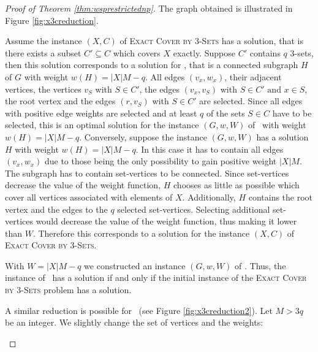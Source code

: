 \begin{proof}[Proof of Theorem \ref{thm:wsprestrictednp}]
	The graph obtained is illustrated in Figure \ref{fig:x3creduction}.\medskip
	
	Assume the instance $(X,C)$ of \textsc{Exact Cover by $3$-Sets} has a solution, that is there exists a subset $C' \subseteq C$ which covers $X$ exactly. Suppose $C'$ contains $q$ $3$-sets, then this solution corresponds to a solution for \maxWSP, that is a connected subgraph $H$ of $G$ with weight $w(H) = |X|M - q$. All edges $(v_x, w_x)$, their adjacent vertices, the vertices $v_S$ with $S \in C'$, the edges $(v_x, v_S)$ with $S \in C' \text{ and } x \in S$, the root vertex and the edges $(r, v_S)$ with $S \in C'$ are selected. Since all edges with positive edge weights are selected and at least $q$ of the sets $S \in C$ have to be selected, this is an optimal solution for the instance $(G,w,W)$ of \maxWSP\ with weight $w(H) = |X|M - q$. Conversely, suppose the instance $(G,w,W)$ has a solution $H$ with weight $w(H) = |X|M - q$. In this case it has to contain all edges $(v_x, w_x)$ due to those being the only possibility to gain positive weight $|X|M$. The subgraph has to contain set-vertices to be connected. Since set-vertices decrease the value of the weight function, $H$ chooses as little as possible which cover all vertices associated with elements of $X$. Additionally, $H$ contains the root vertex and the edges to the $q$ selected set-vertices. Selecting additional set-vertices would decrease the value of the weight function, thus making it lower than $W$. Therefore this corresponds to a solution for the instance $(X,C)$ of \textsc{Exact Cover by $3$-Sets}.\medskip
	
	With $W = |X|M - q$ we constructed an instance $(G, w, W)$ of \maxWSP. Thus, the instance of \maxWSP\ has a solution if and only if the initial instance of the \textsc{Exact Cover by $3$-Sets} problem has a solution.\medskip
	
	A similar reduction is possible for \minWISP\ (see Figure \ref{fig:x3creduction2}). Let $M > 3q$ be an integer. We slightly change the set of vertices and the weights:
	\begin{figure}[h]
\end{figure}
\end{proof}
